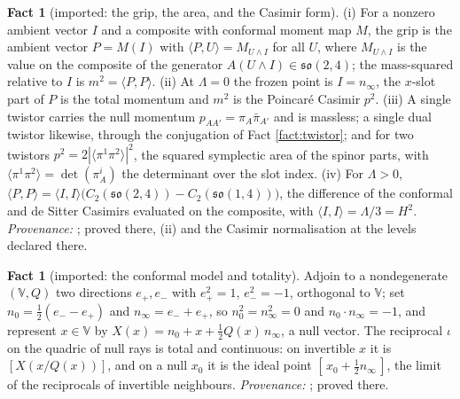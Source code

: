 \documentclass[11pt]{article}
\theoremstyle{definition}
\newtheorem{fact}[theorem]{Fact}
\newcommand{\ip}[2]{\langle #1, #2\rangle}
\newcommand{\br}[1]{\langle #1\rangle}
\newcommand{\so}{\mathfrak{so}}
\newcommand{\nO}{n_{0}}
\newcommand{\nInf}{n_{\infty}}
\begin{document}
\begin{fact}[imported: the grip, the area, and the Casimir form]\label{fact:grip}
(i) For a nonzero ambient vector $I$ and a composite with conformal moment map $M$, the grip is the ambient vector $P = M(I)$ with $\ip{P}{U} = M_{U \wedge I}$ for all $U$, where $M_{U \wedge I}$ is the value on the composite of the generator $A(U \wedge I) \in \so(2,4)$; the mass-squared relative to $I$ is $m^{2} = \ip{P}{P}$. (ii) At $\Lambda = 0$ the frozen point is $I = n_{\infty}$, the $x$-slot part of $P$ is the total momentum and $m^{2}$ is the Poincar\'e Casimir $p^{2}$. (iii) A single twistor carries the null momentum $p_{AA'} = \pi_{A}\bar\pi_{A'}$ and is massless; a single dual twistor likewise, through the conjugation of Fact \ref{fact:twistor}; and for two twistors $p^{2} = 2|\br{\pi^{1}\pi^{2}}|^{2}$, the squared symplectic area of the spinor parts, with $\br{\pi^{1}\pi^{2}} = \det(\pi^{i}_{A})$ the determinant over the slot index. (iv) For $\Lambda > 0$, $\ip{P}{P} = \ip{I}{I}\bigl(C_{2}(\so(2,4)) - C_{2}(\so(1,4))\bigr)$, the difference of the conformal and de Sitter Casimirs evaluated on the composite, with $\ip{I}{I} = \Lambda/3 = H^{2}$. \emph{Provenance:} \cite[Def.~5.4, Prop.~4.1, Prop.~5.7]{ButlerT11}; proved there, (ii) and the Casimir normalisation at the levels declared there.
\end{fact}

\begin{fact}[imported: the conformal model and totality]\label{fact:model}
Adjoin to a nondegenerate $(\mathbb{V}, Q)$ two directions $e_{+}, e_{-}$ with $e_{+}^{2} = 1$, $e_{-}^{2} = -1$, orthogonal to $\mathbb{V}$; set $\nO = \tfrac12(e_{-} - e_{+})$ and $\nInf = e_{-} + e_{+}$, so $\nO^{2} = \nInf^{2} = 0$ and $\nO \cdot \nInf = -1$, and represent $x \in \mathbb{V}$ by $X(x) = \nO + x + \tfrac12 Q(x)\,\nInf$, a null vector. The reciprocal $\iota$ on the quadric of null rays is total and continuous: on invertible $x$ it is $[X(x/Q(x))]$, and on a null $x_{0}$ it is the ideal point $[\,x_{0} + \tfrac12 \nInf\,]$, the limit of the reciprocals of invertible neighbours. \emph{Provenance:} \cite[\S4.2, Thm.~4.10]{ButlerT1}; proved there.
\end{fact}
\end{document}

